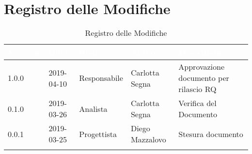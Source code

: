 \newpage

\section*{Registro delle Modifiche}

\begin{center}
\begin{longtable}[c]{|m{}|m{}|m{}|m{}|p{}|}
\hline
\rowcolor{bluelogo}\textbf{\textcolor{white}{Versione}} & \textbf{\textcolor{white}{Data}} & \textbf{\textcolor{white}{Ruolo}} & \textbf{\textcolor{white}{Autore}} & \textbf{\textcolor{white}{Descrizione}}\\
\hline \hline
\endfirsthead
1.0.0 & 2019-04-10 & Responsabile & Carlotta Segna & Approvazione documento per rilascio RQ \\
\hline
\rowcolor{grigio}0.1.0 & 2019-03-26 & Analista & Carlotta Segna & Verifica del Documento \\
\hline
0.0.1 & 2019-03-25 & Progettista & Diego Mazzalovo & Stesura documento \\
\hline
\caption{Registro delle Modifiche}
\end{longtable}
\end{center}
